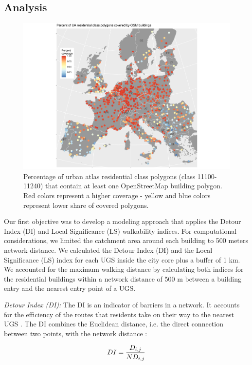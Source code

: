 \documentclass[10pt]{article}
\begin{document}
\subsection{Analysis}
\begin{figure}[t!]
\centering
\includegraphics[width=1\textwidth]{2-1_osm_coverage.pdf}
\caption{Percentage of urban atlas residential class polygons (class 11100-11240) that contain at least one OpenStreetMap building polygon. Red colors represent a higher coverage - yellow and blue colors represent lower share of covered polygons.}
\label{fig:osmcov}
\end{figure}

Our first objective was to develop a modeling approach that applies the Detour Index (DI) and Local Significance (LS) walkability indices.
For computational considerations, we limited the catchment area around each building to 500 meters network distance.
We calculated the Detour Index (DI) and the Local Significance (LS) index for each UGS inside the city core plus a buffer of 1 km.
We accounted for the maximum walking distance by calculating both indices for the residential buildings within a network distance of 500 m between a building entry and the nearest entry point of a UGS.

\textit{Detour Index (DI):}  The DI is an indicator of barriers in a network.
It accounts for the efficiency of the routes that residents take on their way to the nearest UGS \citep{Wolff.2021}. The DI combines the Euclidean distance, i.e. the direct connection between two points, with the network distance \citep{Esch.2014}:

\begin{equation}
\centering
\large{DI = \frac{D_{i,j}}{ND_{i,j}}}
\end{equation}
\end{document}
